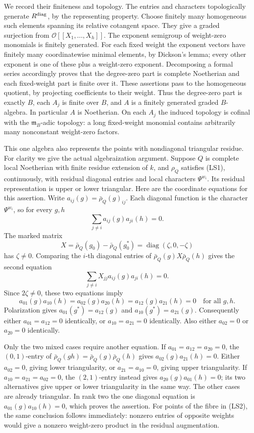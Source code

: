 We record their finiteness and topology.
The entries and characters topologically generate
\(R^{\rm diag}\), by the representing property.
Choose finitely many homogeneous such elements
spanning its relative cotangent space.
They give a graded surjection from
\(\mathcal O[[X_1,\ldots,X_h]]\).
The exponent semigroup of weight-zero monomials
is finitely generated.
For each fixed weight the exponent vectors
have finitely many coordinatewise minimal
elements, by Dickson's lemma; every other
exponent is one of these plus a weight-zero
exponent.
Decomposing a formal series accordingly proves
that the degree-zero part is complete Noetherian
and each fixed-weight part is finite over it.
These assertions pass to the homogeneous quotient,
by projecting coefficients to their weight.
Thus the degree-zero part is exactly \(B\),
each \(A_j\) is finite over \(B\), and \(A\) is
a finitely generated graded \(B\)-algebra.
In particular \(A\) is Noetherian.
On each \(A_j\) the induced topology is cofinal
with the \(\mathfrak m_B\)-adic topology: a long
fixed-weight monomial contains arbitrarily
many nonconstant weight-zero factors.

This one algebra also represents the points
with nondiagonal triangular residue.
For clarity we give the actual algebraization
argument.
Suppose \(Q\) is complete local Noetherian with
finite residue extension of \(k\), and \(\rho_Q\)
satisfies (LS1), continuously, with residual
diagonal entries and local characters
\(\Psi^{w_i}\).
Its residual representation is upper or lower
triangular.
Here are the coordinate equations for this assertion.
Write \(a_{ij}(g)=\bar\rho_Q(g)_{ij}\).
Each diagonal function is the character
\(\Psi^{w_i}\), so for every \(g,h\)
\[
 \sum_{j\ne i}a_{ij}(g)a_{ji}(h)=0.
\]
The marked matrix
\[
 X=\bar\rho_Q(g_0)-\bar\rho_Q(g_0^*)
                         =\operatorname{diag}(\zeta,0,-\zeta)
\]
has \(\zeta\ne0\).
Comparing the \(i\)-th diagonal entries of
\(\bar\rho_Q(g)X\bar\rho_Q(h)\) gives the second equation
\[
 \sum_{j\ne i}X_{jj}a_{ij}(g)a_{ji}(h)=0.
\]
Since \(2\zeta\ne0\), these two equations imply
\[
 a_{01}(g)a_{10}(h)=
 a_{02}(g)a_{20}(h)=
 a_{12}(g)a_{21}(h)=0
                              \quad\text{for all }g,h.
\]
Polarization gives
\(a_{01}(g^*)=a_{12}(g)\) and
\(a_{10}(g^*)=a_{21}(g)\).
Consequently either \(a_{01}=a_{12}=0\) identically,
or \(a_{10}=a_{21}=0\) identically.
Also either \(a_{02}=0\) or \(a_{20}=0\) identically.

Only the two mixed cases require another equation.
If \(a_{01}=a_{12}=a_{20}=0\), the \((0,1)\)-entry
of \(\bar\rho_Q(gh)=\bar\rho_Q(g)\bar\rho_Q(h)\) gives
\(a_{02}(g)a_{21}(h)=0\).
Either \(a_{02}=0\), giving lower triangularity,
or \(a_{21}=a_{10}=0\), giving upper triangularity.
If \(a_{10}=a_{21}=a_{02}=0\), the \((2,1)\)-entry
instead gives \(a_{20}(g)a_{01}(h)=0\);
its two alternatives give upper or lower
triangularity in the same way.
The other cases are already triangular.
In rank two the one diagonal equation is
\(a_{01}(g)a_{10}(h)=0\), which proves the assertion.
For points of the fibre in (LS2), the same
conclusion follows immediately: nonzero entries
of opposite weights would give a nonzero
weight-zero product in the residual augmentation.

